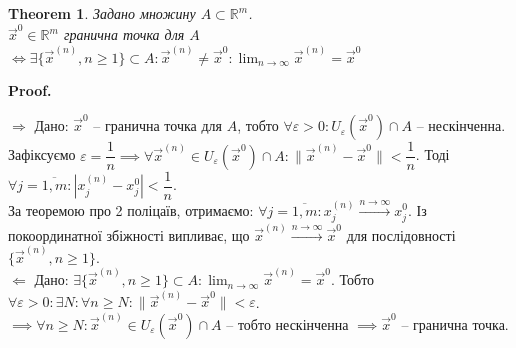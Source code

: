 \documentclass[a4paper, 10pt]{article}
\makeatletter
\def\huge{\displaystyle}
\def\qed{$\blacksquare$}
\def\rightproof{$\boxed{\Rightarrow}$ }
\def\leftproof{$\boxed{\Leftarrow}$ }
\theoremstyle{theoremdd}
\newtheorem{theorem}{Theorem}[subsection]
\theoremstyle{theoremdd}
\theoremstyle{theoremdd}
\theoremstyle{theoremdd}
\theoremstyle{theoremdd}
\theoremstyle{theoremdd}
\theoremstyle{theoremdd}
\theoremstyle{theoremdd}
\theoremstyle{theoremdd}
\renewenvironment{proof}[1][Proof.\\]{\par
\pushQED{\hfill \qed}%
\normalfont \topsep6\p@\@plus6\p@\relax
\trivlist
\item\relax
{\bfseries
#1\@addpunct{.}}\hspace\labelsep\ignorespaces
}{%
\popQED\endtrivlist\@endpefalse
}
\newcommand\Norm[1]{\|#1\|}
\makeatother
\begin{document}
\begin{theorem}
Задано множину $A \subset \mathbb{R}^m$.\\
$\vec{x}^0 \in \mathbb{R}^m$ гранична точка для $A$ $\iff \exists \{\vec{x}^{(n)}, n \geq 1\} \subset A: \vec{x}^{(n)} \neq \vec{x}^0: \huge \lim_{n \to \infty} \vec{x}^{(n)} = \vec{x}^0$\\
\end{theorem}

\begin{proof}
\rightproof Дано: $\vec{x}^0$ -- гранична точка для $A$, тобто $\forall \varepsilon > 0: U_{\varepsilon}(\vec{x}^0) \cap A$ -- нескінченна.\\
Зафіксуємо $\varepsilon = \dfrac{1}{n} \implies \forall \vec{x}^{(n)} \in U_{\varepsilon}(\vec{x}^0) \cap A: \Norm{\vec{x}^{(n)} - \vec{x}^0} < \dfrac{1}{n}$. Тоді $\forall j = \overline{1,m}: |x_j^{(n)} - x_j^0| < \dfrac{1}{n}$.\\
За теоремою про 2 поліцаїв, отримаємо: $\forall j = \overline{1,m}: x_j^{(n)} \overset{n \to \infty}{\longrightarrow} x_j^0$. Із покоординатної збіжності випливає, що $\vec{x}^{(n)} \overset{n \to \infty}{\longrightarrow} \vec{x}^0$ для послідовності $\{\vec{x}^{(n)}, n \geq 1\}$.
\bigskip \\
\leftproof Дано: $\exists \{\vec{x}^{(n)}, n \geq 1\} \subset A: \huge \lim_{n \to \infty} \vec{x}^{(n)} = \vec{x}^0$. Тобто $\forall \varepsilon > 0: \exists N: \forall n \geq N: \Norm{\vec{x}^{(n)} - \vec{x}^0} < \varepsilon$.\\
$\implies \forall n \geq N: \vec{x}^{(n)} \in U_\varepsilon(\vec{x}^0) \cap A$ -- тобто нескінченна $\implies \vec{x}^{0}$ -- гранична точка.
\end{proof}
\end{document}
